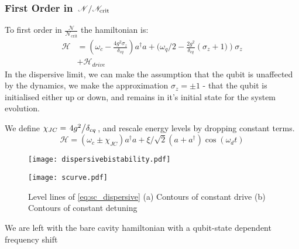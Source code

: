 \subsubsection{First Order in $\flatfrac{\mathscr{N}}{\mathscr{N}_{\text{crit}}}$}
To first order in $\frac{\mathscr{N}}{\mathscr{N}_{\text{crit}}}$ the hamiltonian is:
\begin{align}
  \mathscr{H} &= \left(\omega_c
    - \frac{4g^2\sigma_z}{\delta_{cq}}\right) a ^ \dagger a
    + (\omega_q/2 - \frac{2g^2}{\delta_{cq}} \left(\sigma_z + 1)\right)\sigma_z\nonumber\\
    &+ \mathscr{H}_{drive}
\end{align}
In the dispersive limit, we can make the assumption that the qubit is unaffected by the dynamics, we make the approximation $\sigma_z = \pm 1$ - that the qubit is initialised either up or down, and remains in it's initial state for the system evolution.

We define $\chi_{JC} = \flatfrac{4g^2}{\delta_{cq}}$, and rescale energy levels by dropping constant terms.
\begin{equation}
    \mathscr{H} = \left(\omega_c \pm \chi_{JC}\right) a ^ \dagger a
    + \xi/\sqrt{2} ( a + a^\dagger ) \cos(\omega_d t)
\end{equation}
\begin{figure*}[bht]
  \centering
  \begin{minipage}{0.5\linewidth}
    \vspace*{-0.5cm}
    \hspace*{-1cm}
    \texttt{[image: dispersivebistability.pdf]}
  \end{minipage}%
  \begin{minipage}{0.5\linewidth}
    \texttt{[image: scurve.pdf]}  
  \end{minipage}
  \caption{Level lines of \cref{eq:sc_dispersive} (a) Contours of constant drive (b) Contours of constant detuning}
  \label{fig:sc_dispersive}
\end{figure*}
We are left with the bare cavity hamiltonian with a qubit-state dependent frequency shift
